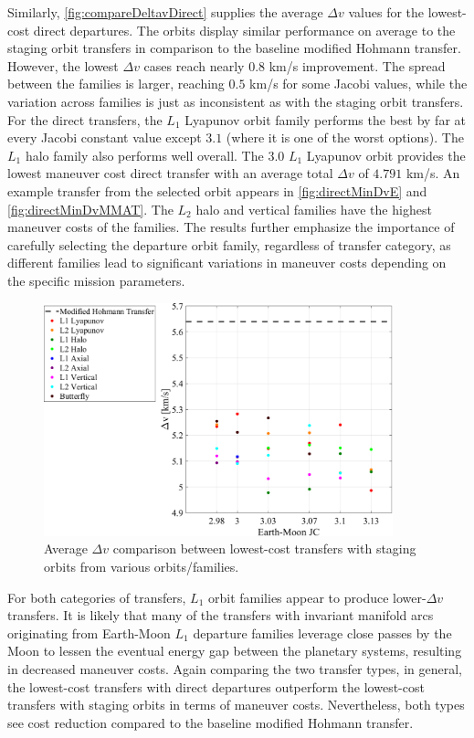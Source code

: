 Similarly, \cref{fig:compareDeltavDirect} supplies the average $\Delta v$ values for the
lowest-cost direct departures. The orbits display similar performance on average to the staging
orbit transfers in comparison to the baseline modified Hohmann transfer. However, the lowest
$\Delta v$ cases reach nearly $0.8$ km/s improvement. The spread between the families is larger,
reaching $0.5$ km/s for some Jacobi values, while the variation across families is just as
inconsistent as with the staging orbit transfers. For the direct transfers, the $L_{1}$ Lyapunov
orbit family performs the best by far at every Jacobi constant value except $3.1$ (where it is one
of the worst options). The $L_{1}$ halo family also performs well overall. The $3.0$ $L_{1}$
Lyapunov orbit provides the lowest maneuver cost direct transfer with an average total $\Delta v$
of $4.791$ km/s. An example transfer from the selected orbit appears in \cref{fig:directMinDvE}
and \cref{fig:directMinDvMMAT}. The $L_{2}$ halo and vertical families have the highest maneuver
costs of the families. The results further emphasize the importance of carefully selecting the
departure orbit family, regardless of transfer category, as different families lead to significant
variations in maneuver costs depending on the specific mission parameters.

\begin{figure}[H]
    \centering
    \includegraphics[width=0.9\textwidth]{figures/DeltavComparisonStaged.pdf}
    \caption{Average $\Delta v$ comparison between lowest-cost transfers with staging orbits from various orbits/families.}
    \label{fig:compareDeltavStaged}
\end{figure}

For both categories of transfers, $L_{1}$ orbit families appear to produce lower-$\Delta v$
transfers. It is likely that many of the transfers with invariant manifold arcs originating from
Earth-Moon $L_{1}$ departure families leverage close passes by the Moon to lessen the eventual
energy gap between the planetary systems, resulting in decreased maneuver costs. Again comparing
the two transfer types, in general, the lowest-cost transfers with direct departures outperform the
lowest-cost transfers with staging orbits in terms of maneuver costs. Nevertheless, both types see
cost reduction compared to the baseline modified Hohmann transfer.

